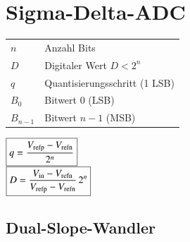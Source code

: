 

\section{Sigma-Delta-ADC}

\begin{minipage}{0.68\linewidth}
    \begin{tabular}{ll}
        $n$ & Anzahl Bits \\
        $D$ & Digitaler Wert \quad $D < 2^n$ \\
        $q$ & Quantisierungsschritt (1 LSB) \\
        $B_0$ & Bitwert 0 (LSB) \\
        $B_{n-1}$ & Bitwert $n-1$ (MSB)
    \end{tabular}
\end{minipage}
\hfill
\begin{minipage}{0.3\linewidth}
    $ \boxed{ q = \frac{V_{\rm refp} - V_{\rm refn}}{2^n} } $ \\
    $ \boxed{ D = \frac{V_{\rm in} - V_{\rm refn}}{V_{\rm refp} - V_{\rm refn}} \, 2^n }  $
\end{minipage}


\subsection{Dual-Slope-Wandler}

